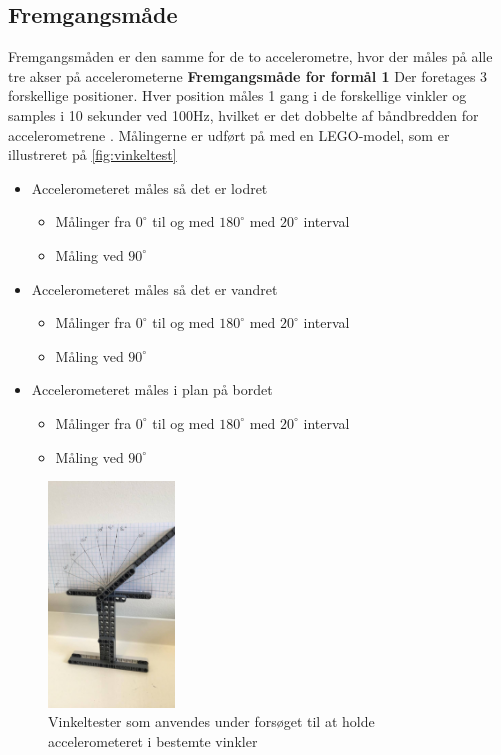 \subsection{Fremgangsmåde} 
Fremgangsmåden er den samme for de to accelerometre, hvor der måles på alle tre akser på accelerometerne 
\textbf{Fremgangsmåde for formål 1} \label{sec:vinkel_fremgangsmaade}
Der foretages 3 forskellige positioner. Hver position måles 1 gang i de forskellige vinkler og samples i 10 sekunder ved 100Hz, hvilket er det dobbelte af båndbredden for accelerometrene \citep{analogdevices2010}. Målingerne er udført på med en LEGO-model, som er illustreret på \autoref{fig:vinkeltest}
\begin{itemize}
\item Accelerometeret måles så det er lodret
\begin{itemize}
\item Målinger fra $0^{\circ}$ til og med $180^{\circ}$ med $20^{\circ}$ interval 
\item Måling ved $90^{\circ}$  
\end{itemize}
\item Accelerometeret måles så det er vandret
\begin{itemize}
\item Målinger fra $0^{\circ}$ til og med $180^{\circ}$ med $20^{\circ}$ interval 
\item Måling ved $90^{\circ}$  
\end{itemize}
\item Accelerometeret måles i plan på bordet
\begin{itemize}
\item Målinger fra $0^{\circ}$ til og med $180^{\circ}$ med $20^{\circ}$ interval 
\item Måling ved $90^{\circ}$  
\end{itemize}
\end{itemize}


\begin{figure}[H]
\centering
\includegraphics[width=0.3\textwidth]{figures/vinkeltest}
\caption{Vinkeltester som anvendes under forsøget til at holde accelerometeret i bestemte vinkler}
\label{fig:vinkeltest}
\end{figure}

